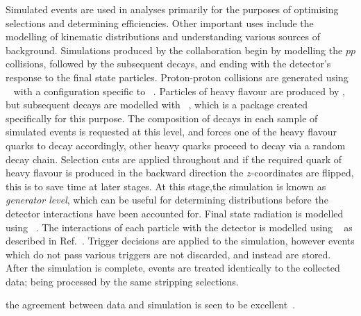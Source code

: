 Simulated events are used in \lhcb analyses primarily for the purposes of optimising selections and
determining efficiencies.
Other important uses include the modelling of kinematic distributions and understanding various
sources of background.
Simulations produced by the \lhcb collaboration begin by modelling the $pp$ collisions, followed by
the subsequent decays, and ending with the detector's response to the final state particles.
Proton-proton collisions are generated using \pythia~\cite{Sjostrand:2006za,*Sjostrand:2007gs} with
a configuration specific to \lhcb~\cite{LHCb-PROC-2010-056}.
Particles of heavy flavour are produced by \pythia, but subsequent decays are modelled with
\evtgen~\cite{Lange:2001uf}, which is a package created specifically for this purpose.
The composition of decays in each sample of simulated events is requested at this level, and
\evtgen forces one of the heavy flavour quarks to decay accordingly, other heavy quarks proceed to
decay via a random decay chain.
Selection cuts are applied throughout and if the required quark of heavy
flavour is produced in the backward direction the $z$-coordinates are flipped, this is to save time
at later stages.
At this stage,the simulation is known as \emph{generator level}, which can be useful for
determining distributions before the detector interactions have been accounted for.
Final state radiation is modelled using \photos~\cite{Golonka:2005pn}.
The interactions of each particle with the \lhcb detector is modelled using
\geant~\cite{Allison:2006ve,*Agostinelli:2002hh} as described in Ref.~\cite{LHCb-PROC-2011-006}.
Trigger decisions are applied to the simulation, however events which do not pass various triggers
are not discarded, and instead are stored.
After the simulation is complete, events are treated identically to the collected data; being
processed by the same stripping selections.


the agreement between data and simulation is seen to be excellent~\cite{LHCb-DP-2014-001}.


